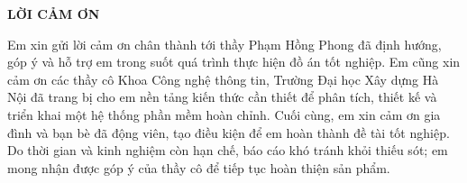 \documentclass[../DoAn.tex]{subfiles}
\begin{document}
\begin{center}
    \Large{\textbf{LỜI CẢM ƠN}}\\
\end{center}
\vspace{1cm}
Em xin gửi lời cảm ơn chân thành tới thầy Phạm Hồng Phong đã định hướng, góp ý và hỗ trợ em trong suốt quá trình thực hiện đồ án tốt nghiệp. Em cũng xin cảm ơn các thầy cô Khoa Công nghệ thông tin, Trường Đại học Xây dựng Hà Nội đã trang bị cho em nền tảng kiến thức cần thiết để phân tích, thiết kế và triển khai một hệ thống phần mềm hoàn chỉnh. Cuối cùng, em xin cảm ơn gia đình và bạn bè đã động viên, tạo điều kiện để em hoàn thành đề tài tốt nghiệp. Do thời gian và kinh nghiệm còn hạn chế, báo cáo khó tránh khỏi thiếu sót; em mong nhận được góp ý của thầy cô để tiếp tục hoàn thiện sản phẩm.
\end{document}
